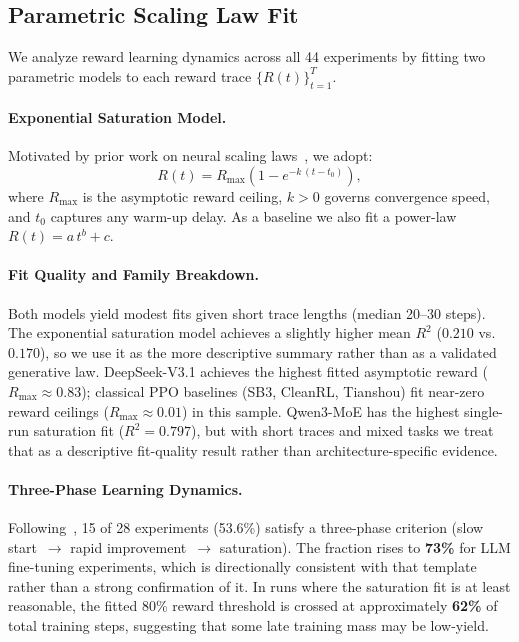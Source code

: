\documentclass{article}
\begin{document}
\subsection{Parametric Scaling Law Fit}
\label{sec:scaling_laws}

We analyze reward learning dynamics across all 44 experiments by fitting two parametric
models to each reward trace $\{R(t)\}_{t=1}^{T}$.

\paragraph{Exponential Saturation Model.}
Motivated by prior work on neural scaling laws~\cite{nimmaturi2025predictive}, we adopt:
\begin{equation}
  \label{eq:exp_sat}
  R(t) = R_{\max}\!\left(1 - e^{-k\,(t - t_0)}\right),
\end{equation}
where $R_{\max}$ is the asymptotic reward ceiling, $k > 0$ governs convergence speed,
and $t_0$ captures any warm-up delay.
As a baseline we also fit a power-law $R(t) = a\,t^{b} + c$.

\paragraph{Fit Quality and Family Breakdown.}
Both models yield modest fits given short trace lengths (median 20--30 steps).
The exponential saturation model achieves a slightly higher mean $R^{2}$
($0.210$ vs.\ $0.170$), so we use it as the more descriptive summary rather
than as a validated generative law. DeepSeek-V3.1 achieves the highest fitted
asymptotic reward ($R_{\max} \approx 0.83$); classical PPO baselines (SB3,
CleanRL, Tianshou) fit near-zero reward ceilings ($R_{\max} \approx 0.01$) in
this sample. Qwen3-MoE has the highest single-run saturation fit
($R^{2} = 0.797$), but with short traces and mixed tasks we treat that as a
descriptive fit-quality result rather than architecture-specific evidence.

\paragraph{Three-Phase Learning Dynamics.}
Following~\citet{nimmaturi2025predictive}, 15 of 28 experiments (53.6\%)
satisfy a three-phase criterion (slow start~$\to$ rapid improvement~$\to$
saturation). The fraction rises to \textbf{73\%} for LLM fine-tuning
experiments, which is directionally consistent with that template rather than
a strong confirmation of it. In runs where the saturation fit is at least
reasonable, the fitted 80\% reward threshold is crossed at approximately
\textbf{62\%} of total training steps, suggesting that some late training mass
may be low-yield.
\end{document}
